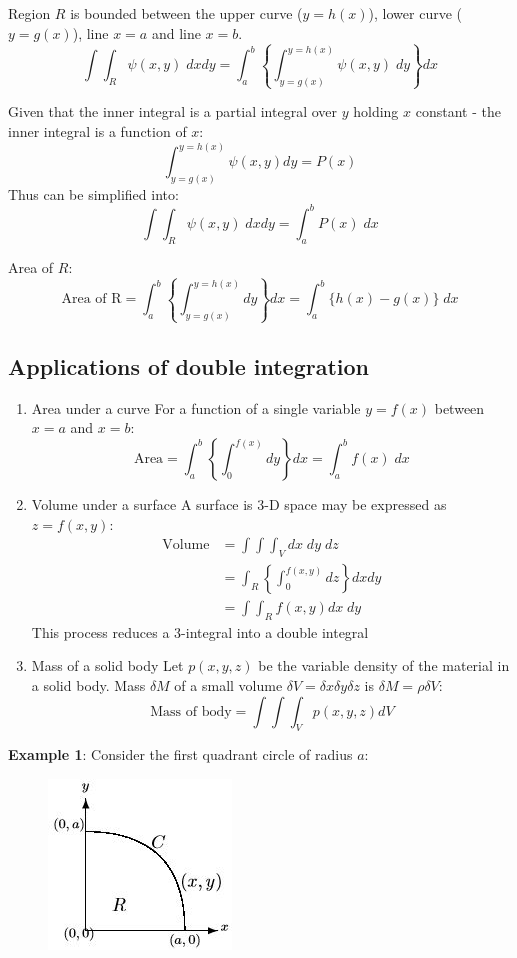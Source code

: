 \documentclass[10pt,a4paper]{article}
\begin{document}
Region $R$ is bounded between the upper curve ($y=h(x)$), lower curve ($y=g(x)$), line $x=a$ and
line $x=b$.
$$
    \int \int_R \psi(x,y)\; dxdy = \int_a^b \left\{\int_{y=g(x)}^{y=h(x)}\psi(x,y)\;dy\right\} dx
$$

Given that the inner integral is a partial integral over $y$ holding $x$ constant - the inner
integral is a function of $x$:
$$
    \int_{y=g(x)}^{y=h(x)} \psi(x,y)dy = P(x)
$$
Thus can be simplified into:
$$
    \int \int_R \psi(x,y)\; dxdy = \int_a^b P(x)\; dx
$$

\begin{tcolorbox}[breakable,colback=white]
Area of $R$:
$$
    \text{Area of R} = \int_a^b\left\{\int_{y=g(x)}^{y=h(x)} dy\right\} dx = \int_a^b \{h(x)-g(x)\}\; dx
$$
\end{tcolorbox}

\subsection{Applications of double integration}

\begin{enumerate}
    \item Area under a curve
    For a function of a single variable $y=f(x)$ between $x=a$ and $x=b$:
    $$
        \text{Area} = \int_a^b \left\{\int_0^{f(x)}dy\right\}dx = \int_a^b f(x) \; dx
    $$
    \item Volume under a surface
    A surface is 3-D space may be expressed as $z=f(x,y)$:
    \begin{align*}
        \text{Volume}&=\int \int \int_V dx\;dy\;dz\\
        &= \int_R \left\{\int_0^{f(x,y)}dz\right\}dxdy \\
        &= \int \int_R f(x,y)dx\;dy
    \end{align*}
    This process reduces a 3-integral into a double integral
    \item Mass of a solid body
    Let $p(x,y,z)$ be the variable density of the material in a solid body. Mass $\delta M$ of
    a small volume $\delta V = \delta x \delta y \delta z$ is $\delta M = \rho \delta V$:
    $$
        \text{Mass of body} = \int \int \int_V p(x,y,z) dV
    $$
\end{enumerate}

\textbf{Example 1}: Consider the first quadrant circle of radius $a$:
\begin{figure} [h!]
    \centering
    \includegraphics[scale=0.7]{Ex3.JPG}
\end{figure}
\end{document}
